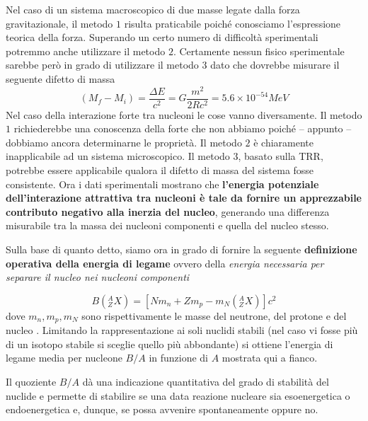 Nel caso di un sistema macroscopico di due masse legate dalla forza
gravitazionale, il metodo \(1\) risulta praticabile poiché conosciamo
l'espressione teorica della forza. Superando un certo numero di
difficoltà sperimentali potremmo anche utilizzare il metodo \(2.\)
Certamente nessun fisico sperimentale sarebbe però in grado di
utilizzare il metodo \(3\) dato che dovrebbe misurare il seguente
difetto di massa \[
					 (M_{f}-M_{i}) = \frac{\Delta E}{c^{2}} = G \frac{m^{2}}{2Rc^{2}} = 5.6 \times 10^{-54} MeV
\] Nel caso della interazione forte tra nucleoni le cose vanno
diversamente. Il metodo \(1\) richiederebbe una conoscenza della forte
che non abbiamo poiché -- appunto -- dobbiamo ancora determinarne le
proprietà. Il metodo \(2\) è chiaramente inapplicabile ad un sistema
microscopico. Il metodo \(3\), basato sulla TRR, potrebbe essere
applicabile qualora il difetto di massa del sistema fosse consistente.
Ora i dati sperimentali mostrano che \textbf{l'energia potenziale
dell'interazione attrattiva tra nucleoni è tale da fornire un
apprezzabile contributo negativo alla inerzia del nucleo}, generando una
differenza misurabile tra la massa dei nucleoni componenti e quella del
nucleo stesso.

Sulla base di quanto detto, siamo ora in grado di fornire la seguente
\textbf{definizione operativa della energia di legame} ovvero della
\emph{energia necessaria per separare il nucleo nei nucleoni componenti}

\begin{equation}
	B\left( {}^{A}_{Z}X \right)  = \left[ Nm_{n} + Zm_{p} -m_{N}\left( {}^{A}_{Z}X \right) \right]c^{2}
\end{equation}
dove $m_{n},m_{p},m_{N}$ sono rispettivamente le masse del neutrone, del protone e del nucleo
.
Limitando la rappresentazione ai soli nuclidi stabili (nel caso vi fosse più di un isotopo stabile si sceglie quello più abbondante) si ottiene l'energia di legame media per nucleone $B/A$ in funzione di $A$ mostrata qui a fianco.

Il quoziente $B/A$ dà una indicazione quantitativa del grado di stabilità del nuclide e permette di stabilire se una data reazione nucleare sia esoenergetica o endoenergetica e, dunque, se possa avvenire spontaneamente oppure no.

